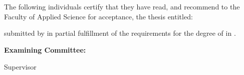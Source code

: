 \chapter*{}
The following individuals certify that they have read, and recommend to the Faculty of Applied Science for acceptance, the thesis entitled:


\textbf{\theTitle}

submitted by \textbf{\theAuthor} in partial fulfillment of the requirements for the degree of \textbf{\theDegree} in \textbf{\theProgramTitle}.

\textbf{Examining Committee:}

 {Supervisor}







